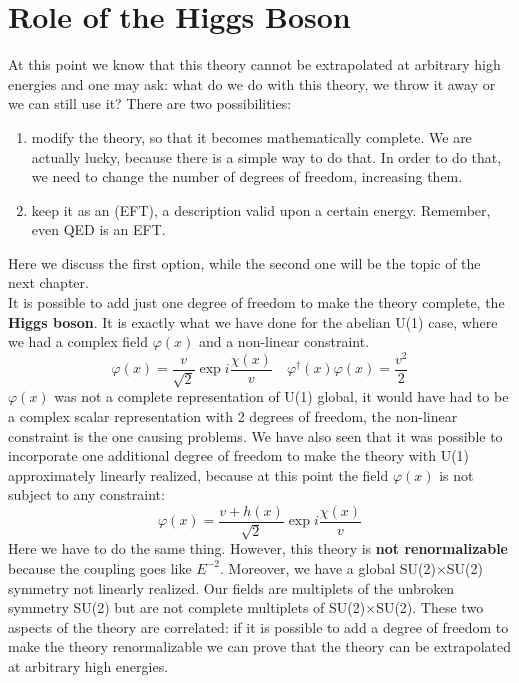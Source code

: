 \documentclass[../main.tex]{subfiles}
\begin{document}
\section{Role of the Higgs Boson}
At this point we know that this theory cannot be extrapolated at arbitrary high energies and one may ask: what do we do with this theory, we throw it away or we can still use it? There are two possibilities:
\begin{enumerate}
    \item modify the theory, so that it becomes mathematically complete. We are actually lucky, because there is a simple way to do that. In order to do that, we need to change the number of degrees of freedom, increasing them.
    \item keep it as an  (EFT), a description valid upon a certain energy. Remember, even QED is an EFT.
\end{enumerate}
Here we discuss the first option, while the second one will be the topic of the next chapter.\\
It is possible to add just one degree of freedom to make the theory complete, the \textbf{Higgs boson}. It is exactly what we have done for the abelian U(1) case, where we had a complex field $\varphi(x)$ and a non-linear constraint.
\[
\varphi(x)=\frac{v}{\sqrt{2}}\exp{i\frac{\chi(x)}{v}} \quad \varphi^\dagger(x)\varphi(x)=\frac{v^2}{2}
\]
$\varphi(x)$ was not a complete representation of U(1) global, it would have had to be a complex scalar representation with 2 degrees of freedom, the non-linear constraint is the one causing problems. We have also seen that it was possible to incorporate one additional degree of freedom to make the theory with U(1) approximately linearly realized, because at this point the field $\varphi(x)$ is not subject to any constraint:
\[
\varphi(x)=\frac{v+h(x)}{\sqrt{2}}\exp{i\frac{\chi(x)}{v}}
\]
Here we have to do the same thing. However, this theory is \textbf{not renormalizable} because the coupling goes like $E^{-2}$. Moreover, we have a global SU(2)$\times$SU(2) symmetry not linearly realized. Our fields are multiplets of the unbroken symmetry SU(2) but are not complete multiplets of SU(2)$\times$SU(2). These two aspects of the theory are correlated: if it is possible to add a degree of freedom to make the theory renormalizable we can prove that the theory can be extrapolated at arbitrary high energies.\\
\end{document}
